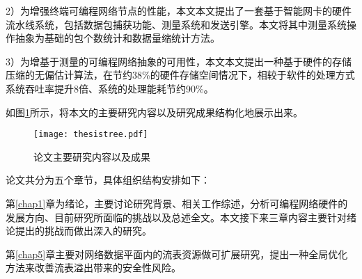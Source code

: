 2）为增强终端可编程网络节点的性能，本文本文提出了一套基于智能网卡的硬件流水线系统，包括数据包捕获功能、测量系统和发送引擎。本文将其中测量系统操作抽象为基础的包个数统计和数据量缩统计方法。

3）为增基于测量的可编程网络抽象的可用性，本文本文提出一种基于硬件的存储压缩的无偏估计算法，在节约38\%的硬件存储空间情况下，相较于软件的处理方式系统吞吐率提升8倍、系统的处理能耗节约90\%。



如图\ref{fig:thesistree}所示，将本文的主要研究内容以及研究成果结构化地展示出来。


\begin{figure}[!ht]
	\centering 
	\vspace{-1.5mm}
	\texttt{[image: thesistree.pdf]}
	\caption{论文主要研究内容以及成果} \label{fig:thesistree}
\end{figure}







\label{chap15}

论文共分为五个章节，具体组织结构安排如下：

第\ref{chap1}章为绪论，主要讨论研究背景、相关工作综述，分析可编程网络硬件的发展方向、目前研究所面临的挑战以及总述全文。本文接下来三章内容主要针对绪论提出的挑战而做出深入的研究。

第\ref{chap5}章主要对网络数据平面内的流表资源做可扩展研究，提出一种全局优化方法来改善流表溢出带来的安全性风险。


